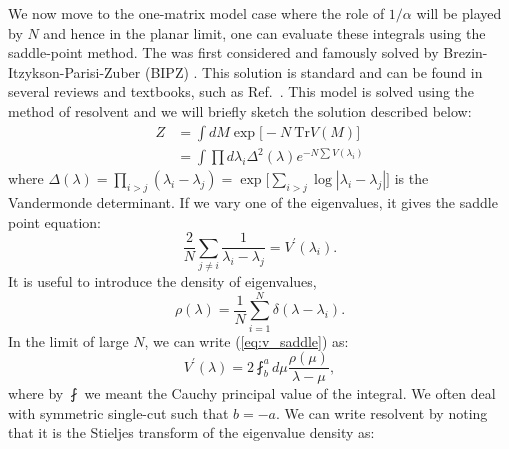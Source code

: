 \documentclass[letter,11pt]{article}
\begin{document}
We now move to the one-matrix model case where the role of $1/\alpha$ will be played by $N$ and hence in the planar limit, one can evaluate these integrals using the saddle-point method. The was first considered and famously solved by Brezin-Itzykson-Parisi-Zuber (BIPZ) \cite{Brezin:1977sv}. This solution is standard and can be found in several reviews and textbooks, such as Ref.~\cite{DiFrancesco:1993cyw, Marino:2004eq, 2002mcgt.book.....M}. This model is solved using the method of resolvent
and we will briefly sketch the solution described below:
\begin{align}
	Z &= \int dM \exp\Big[-N~\mbox{Tr} V(M)\Big] \\
	& = \int \prod d\lambda_{i} \Delta^2(\lambda)  e^{-N \sum V(\lambda_i)} 
\end{align}
where $\Delta(\lambda) = \prod_{i > j} (\lambda_i - \lambda_j) = \exp\Big[\sum_{i>j} \log |\lambda_{i} - \lambda_{j}|\Big]$ is the Vandermonde 
determinant. If we vary one of the eigenvalues, it gives the saddle point equation:
\begin{equation}
	\label{eq:v_saddle}
	\frac{2}{N} \sum_{j \neq i} \frac{1}{\lambda_i - \lambda_j} = V^{\prime}(\lambda_i).
\end{equation}
It is useful to introduce the density of eigenvalues,
\begin{equation}
	\rho(\lambda) = \frac{1}{N} \sum_{i=1}^{N} \delta(\lambda - \lambda_i). 
\end{equation}
In the limit of large $N$, we can write (\ref{eq:v_saddle})
as:
\begin{equation}
	\label{eq:vprime}
	V^{\prime}(\lambda) = 2 \fint_{b}^{a} d\mu \frac{\rho(\mu)}{\lambda - \mu}, 
\end{equation}
where by $\fint$ we meant the Cauchy principal value of the integral. We 
often deal with symmetric single-cut such that $b=-a$. 
We can write resolvent by noting that it is the Stieljes transform of the eigenvalue density as: 
\end{document}
